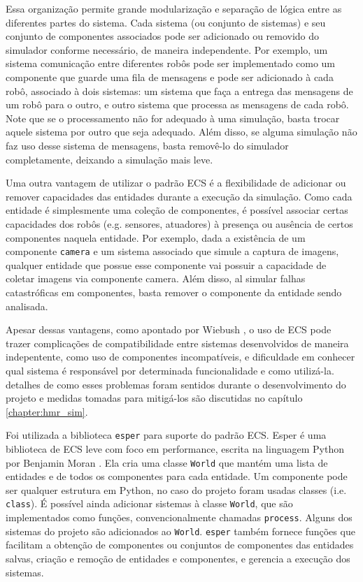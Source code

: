 Essa organização permite grande modularização e separação de lógica entre as diferentes partes do sistema. Cada sistema (ou conjunto de sistemas) e seu conjunto de componentes associados pode ser adicionado ou removido do simulador conforme necessário, de maneira independente. Por exemplo, um sistema comunicação entre diferentes robôs pode ser implementado como um componente que guarde uma fila de mensagens e pode ser adicionado à cada robô, associado à dois sistemas: um sistema que faça a entrega das mensagens de um robô para o outro, e outro sistema que processa as mensagens de cada robô. Note que se o processamento não for adequado à uma simulação, basta trocar aquele sistema por outro que seja adequado. Além disso, se alguma simulação não faz uso desse sistema de mensagens, basta removê-lo do simulador completamente, deixando a simulação mais leve.

Uma outra vantagem de utilizar o padrão ECS é a flexibilidade de adicionar ou remover capacidades das entidades durante a execução da simulação. Como cada entidade é simplesmente uma coleção de componentes, é possível associar certas capacidades dos robôs (e.g. sensores, atuadores) à presença ou ausência de certos componentes naquela entidade. Por exemplo, dada a existência de um componente \texttt{camera} e um sistema associado que simule a captura de imagens, qualquer entidade que possue esse componente vai possuir a capacidade de coletar imagens via componente camera. Além disso, al simular falhas catastróficas em componentes, basta remover o componente da entidade sendo analisada.

Apesar dessas vantagens, como apontado por Wiebush \cite{wiebusch2015decoupling}, o uso de ECS pode trazer complicações de compatibilidade entre sistemas desenvolvidos de maneira indepentente, como uso de componentes incompatíveis, e dificuldade em conhecer qual sistema é responsável por determinada funcionalidade e como utilizá-la. detalhes de como esses problemas foram sentidos durante o desenvolvimento do projeto e medidas tomadas para mitigá-los são discutidas no capítulo \ref{chapter:hmr_sim}.

Foi utilizada a biblioteca \texttt{esper} para suporte do padrão ECS. Esper é uma biblioteca de ECS leve com foco em performance, escrita na linguagem Python por Benjamin Moran \cite{esper}. Ela cria uma classe \texttt{World} que mantém uma lista de entidades e de todos os componentes para cada entidade. Um componente pode ser qualquer estrutura em Python, no caso do projeto foram usadas classes (i.e. \texttt{class}). É possível ainda adicionar sistemas à classe \texttt{World}, que são implementados como funções, convencionalmente chamadas \texttt{process}. Alguns dos sistemas do projeto são adicionados ao \texttt{World}. \texttt{esper} também fornece funções que facilitam a obtenção de componentes ou conjuntos de componentes das entidades salvas, criação e remoção de entidades e componentes, e gerencia a execução dos sistemas.


